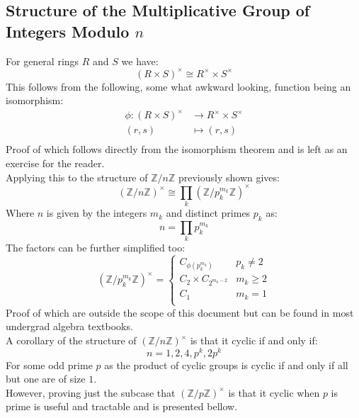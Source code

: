 \subsection{Structure of the Multiplicative Group of Integers Modulo $n$}
For general rings $R$ and $S$ we have:
\[(R\times S)^\times \cong R^\times \times S^\times\]
This follows from the following, some what awkward looking, function being an isomorphism:
\begin{equation*}
\begin{aligned}
	\phi:(R\times S)^\times&\rightarrow R^\times \times S^\times\\
	(r,s)&\mapsto (r,s)\\
\end{aligned}
\end{equation*}
Proof of which follows directly from the isomorphism theorem and is left as an exercise for the reader.
\\

Applying this to the structure of $\mathbb{Z}/n\mathbb{Z}$ previously shown gives:
\[(\mathbb{Z}/n\mathbb{Z})^\times \cong \prod_k (\mathbb{Z}/p_k^{m_k}\mathbb{Z})^\times\]
Where $n$ is given by the integers $m_k$ and distinct primes $p_k$ as:
\[n =\prod_k p_k^{m_k} \]
The factors can be further simplified too:
\[(\mathbb{Z}/p_k^{m_k}\mathbb{Z})^\times =\begin{cases} 
	C_{\phi\left(p_k^{m_k}\right)} & p_k \neq 2\\
	C_2\times C_{2^{m_k-2}} & m_k\geq 2\\
	C_1 & m_k = 1\\
\end{cases}\]
Proof of which are outside the scope of this document but can be found in most undergrad algebra textbooks.
\\

A corollary of the structure of $(\mathbb{Z}/n\mathbb{Z})^\times$ is that it cyclic if and only if:
\[n = 1,2,4,p^k,2p^k\]
For some odd prime $p$ as the product of cyclic groups is cyclic if and only if all but one are of size $1$.
\\

However,
proving just the subcase that $(\mathbb{Z}/p\mathbb{Z})^\times$ is that it cyclic when $p$ is prime is useful and tractable and is presented bellow. 

